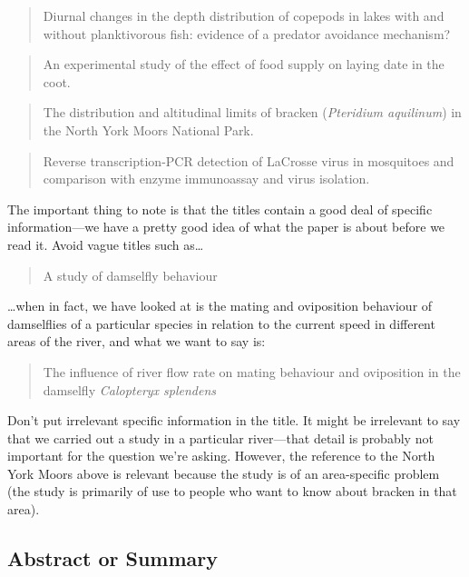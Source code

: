 \documentclass[
]{book}
\begin{document}
\begin{quote}
Diurnal changes in the depth distribution of copepods in lakes with and without planktivorous fish: evidence of a predator avoidance mechanism?
\end{quote}

\begin{quote}
An experimental study of the effect of food supply on laying date in the coot.
\end{quote}

\begin{quote}
The distribution and altitudinal limits of bracken (\emph{Pteridium aquilinum}) in the North York Moors National Park.
\end{quote}

\begin{quote}
Reverse transcription-PCR detection of LaCrosse virus in mosquitoes and comparison with enzyme immunoassay and virus isolation.
\end{quote}

The important thing to note is that the titles contain a good deal of specific information---we have a pretty good idea of what the paper is about before we read it. Avoid vague titles such as\ldots{}

\begin{quote}
A study of damselfly behaviour
\end{quote}

\ldots when in fact, we have looked at is the mating and oviposition behaviour of damselflies of a particular species in relation to the current speed in different areas of the river, and what we want to say is:

\begin{quote}
The influence of river flow rate on mating behaviour and oviposition in the damselfly \emph{Calopteryx splendens}
\end{quote}

Don't put irrelevant specific information in the title. It might be irrelevant to say that we carried out a study in a particular river---that detail is probably not important for the question we're asking. However, the reference to the North York Moors above is relevant because the study is of an area-specific problem (the study is primarily of use to people who want to know about bracken in that area).

\hypertarget{abstract-or-summary}{%
\subsection{Abstract or Summary}\label{abstract-or-summary}}
\end{document}
